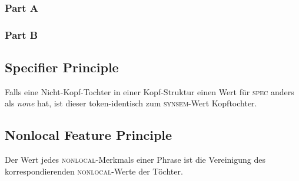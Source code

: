 \documentclass[10pt,a4paper]{article}
\begin{document}
\subsubsection{Part A}

 \scalebox{1}{%
\begin{avm}
  \[ synsem|loc|cont & \@1 \\
     hd-dtr|synsem|loc|cont & \@1
  \] 
\end{avm}}

\subsubsection{Part B}

 \scalebox{1}{%
  \begin{avm}
    \[ cont & \@1 \\
       nhd-dtr|synsem|loc|cont & \@1
    \] 
\end{avm}}

\subsection{Specifier Principle}

Falls eine Nicht-Kopf-Tochter in einer Kopf-Struktur einen Wert für \textsc{spec} anders als \textit{none} hat, ist dieser token-identisch zum \textsc{synsem}-Wert Kopftochter.

\subsection{Nonlocal Feature Principle}

Der Wert jedes \textsc{nonlocal}-Merkmals einer Phrase ist die Vereinigung des korrespondierenden \textsc{nonlocal}-Werte der Töchter.
\end{document}
